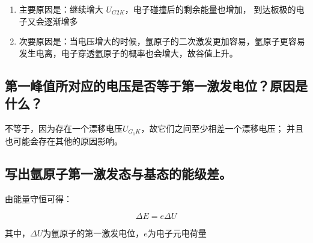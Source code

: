 \documentclass[a4paper,UTF8]{ctexart}
\begin{document}
\begin{enumerate}
    \item 主要原因是：继续增大 $U_{G2K}$，电子碰撞后的剩余能量也增加，
到达板极的电子又会逐渐增多
    \item 次要原因是：当电压增大的时候，氩原子的二次激发更加容易，氩原子更容易发生电离，电子穿透氩原子的概率也会增大，故谷值上升。
\end{enumerate}

\subsection{第一峰值所对应的电压是否等于第一激发电位？原因是什么？}

不等于，因为存在一个漂移电压$U_{G_{1}K}$，故它们之间至少相差一个漂移电压；
并且也可能会存在其他的原因影响。

\subsection{写出氩原子第一激发态与基态的能级差。}

由能量守恒可得：

\begin{equation}
    \Delta E = e \Delta U
\end{equation}

其中，$\Delta U$为氩原子的第一激发电位，$e$为电子元电荷量




\end{document}
